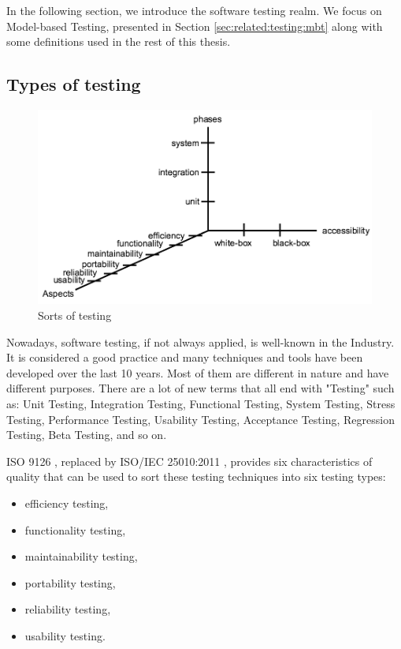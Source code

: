 In the following section, we introduce the software testing
realm. We focus on Model-based Testing, presented in Section
\ref{sec:related:testing:mbt} along with some definitions used
in the rest of this thesis.

\subsection{Types of testing}

\begin{figure}[ht]
    \begin{center}
    \includegraphics[width=1.0\linewidth]{figures/sorts-of-testing.png}
    \end{center}

    \caption{Sorts of testing}
\end{figure}

Nowadays, software testing, if not always applied, is well-known
in the Industry. It is considered a good practice and many
techniques and tools have been developed over the last 10 years.
Most of them are different in nature and have different purposes.
There are a lot of new terms that all end with "Testing" such as:
Unit Testing, Integration Testing, Functional Testing, System
Testing, Stress Testing, Performance Testing, Usability Testing,
Acceptance Testing, Regression Testing, Beta Testing, and so on.

ISO 9126 \cite{iso9126}, replaced by ISO/IEC 25010:2011
\cite{10951538}, provides six characteristics of quality that can
be used to sort these testing techniques into six testing types:

\begin{itemize}
\item efficiency testing,
\item functionality testing,
\item maintainability testing,
\item portability testing,
\item reliability testing,
\item usability testing.
\end{itemize}

